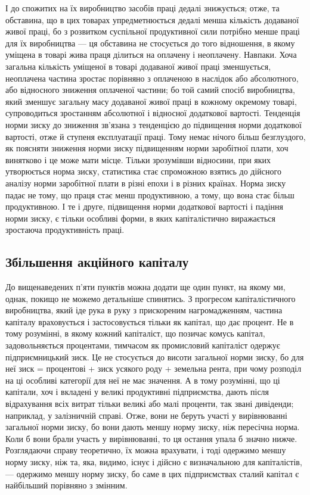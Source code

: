 \parcont{}  %
І до спожитих на їх виробництво засобів праці дедалі знижується; отже, та обставина, що в цих
товарах упредметнюється дедалі менша кількість додаваної живої праці, бо з розвитком суспільної
продуктивної сили потрібно менше праці для їх виробництва — ця обставина не стосується до того
відношення, в якому уміщена в товарі жива праця ділиться на оплачену і неоплачену. Навпаки. Хоча
загальна кількість уміщеної в товарі додаваної живої праці зменшується, неоплачена частина зростає
порівняно з оплаченою в наслідок або абсолютного, або відносного зниження оплаченої частини; бо той
самий спосіб виробництва, який зменшує загальну масу додаваної живої праці в кожному окремому
товарі, супроводиться зростанням абсолютної і відносної додаткової вартості. Тенденція норми зиску
до зниження зв’язана з тенденцією до підвищення норми додаткової вартості, отже й ступеня
експлуатації праці. Тому немає нічого більш безглуздого, як поясняти зниження норми зиску
підвищенням норми заробітної плати, хоч винятково і це може мати місце. Тільки зрозумівши відносини,
при яких утворюється норма зиску, статистика стає спроможною взятись до дійсного аналізу норми
заробітної плати в різні епохи і в різних країнах. Норма зиску падає не тому, що праця стає менш
продуктивною, а тому, що вона стає більш продуктивною. І те і друге, підвищення норми додаткової
вартості і падіння норми зиску, є тільки особливі форми, в яких капіталістично виражається зростаюча
продуктивність праці.

\subsection{Збільшення акційного капіталу}

До вищенаведених п’яти пунктів можна додати ще один пункт, на якому ми, однак, покищо не можемо
детальніше спинятись. З прогресом капіталістичного виробництва, який іде рука в руку з прискореним
нагромадженням, частина капіталу враховується і застосовується тільки як капітал, що дає процент. Не
в тому розумінні, в якому кожний капіталіст, що позичає комусь капітал, задовольняється процентами,
тимчасом як промисловий капіталіст одержує підприємницький зиск. Це не стосується до висоти
загальної норми зиску, бо для неї зиск = процентові + зиск усякого роду + земельна рента, при чому
розподіл на ці особливі категорії для неї не має значення. А в тому
розумінні, що ці капітали, хоч і вкладені у великі продуктивні підприємства, дають після
відрахування всіх витрат тільки великі або малі проценти, так звані дивіденди; наприклад, у
залізничній справі. Отже, вони не беруть участі у вирівнюванні загальної норми зиску, бо вони дають
меншу норму зиску, ніж пересічна норма. Коли б вони брали участь у вирівнюванні, то ця остання упала
б значно нижче. Розглядаючи справу теоретично, їх можна врахувати, і тоді одержимо меншу норму
зиску, ніж та, яка, видимо, існує і дійсно є визначальною для капіталістів, — одержимо меншу норму
зиску, бо саме в цих підприємствах сталий капітал є найбільший порівняно з змінним.
